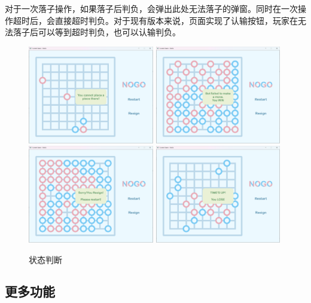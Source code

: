 \documentclass{noithesis}
\begin{document}
	对于一次落子操作，如果落子后判负，会弹出此处无法落子的弹窗。同时在一次操作超时后，会直接超时判负。对于现有版本来说，页面实现了认输按钮，玩家在无法落子后可以等到超时判负，也可以认输判负。
	
	\begin{figure}[htbp]
		\centering
		\includegraphics[width=5.5cm]{img/tip.png}
		\includegraphics[width=5.5cm]{img/win.png}
		\includegraphics[width=5.5cm]{img/resign.png}
		\includegraphics[width=5.5cm]{img/TLE.png}
		\caption{状态判断}
	\end{figure}
	
	\subsection{更多功能}
	
\end{document}
